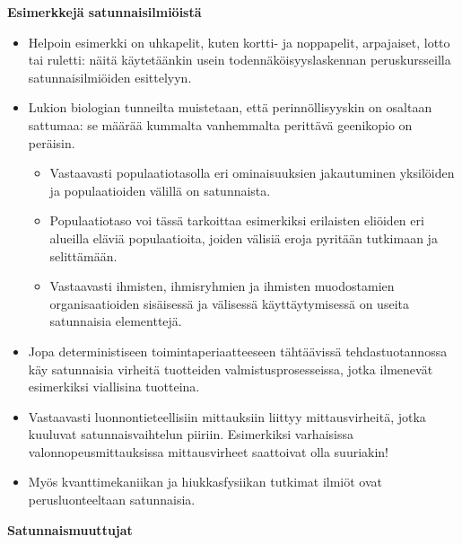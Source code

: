 \documentclass[
]{book}
\providecommand{\tightlist}{%
  \setlength{\itemsep}{0pt}\setlength{\parskip}{0pt}}
\begin{document}
\begin{eblock}{}

\textbf{Esimerkkejä satunnaisilmiöistä}

\begin{itemize}
\tightlist
\item
  Helpoin esimerkki on uhkapelit, kuten kortti- ja noppapelit, arpajaiset, lotto tai ruletti: näitä käytetäänkin usein todennäköisyyslaskennan peruskursseilla satunnaisilmiöiden esittelyyn.
\item
  Lukion biologian tunneilta muistetaan, että perinnöllisyyskin on osaltaan sattumaa: se määrää kummalta vanhemmalta perittävä geenikopio on peräisin.

  \begin{itemize}
  \tightlist
  \item
    Vastaavasti populaatiotasolla eri ominaisuuksien jakautuminen yksilöiden ja populaatioiden välillä on satunnaista.
  \item
    Populaatiotaso voi tässä tarkoittaa esimerkiksi erilaisten eliöiden eri alueilla eläviä populaatioita, joiden välisiä eroja pyritään tutkimaan ja selittämään.
  \item
    Vastaavasti ihmisten, ihmisryhmien ja ihmisten muodostamien organisaatioiden sisäisessä ja välisessä käyttäytymisessä on useita satunnaisia elementtejä.
  \end{itemize}
\item
  Jopa deterministiseen toimintaperiaatteeseen tähtäävissä tehdastuotannossa käy satunnaisia virheitä tuotteiden valmistusprosesseissa, jotka ilmenevät esimerkiksi viallisina tuotteina.
\item
  Vastaavasti luonnontieteellisiin mittauksiin liittyy mittausvirheitä, jotka kuuluvat satunnaisvaihtelun piiriin. Esimerkiksi varhaisissa valonnopeusmittauksissa mittausvirheet saattoivat olla suuriakin!
\item
  Myös kvanttimekaniikan ja hiukkasfysiikan tutkimat ilmiöt ovat perusluonteeltaan satunnaisia.
\end{itemize}

\end{eblock}

\textbf{Satunnaismuuttujat}
\end{document}
